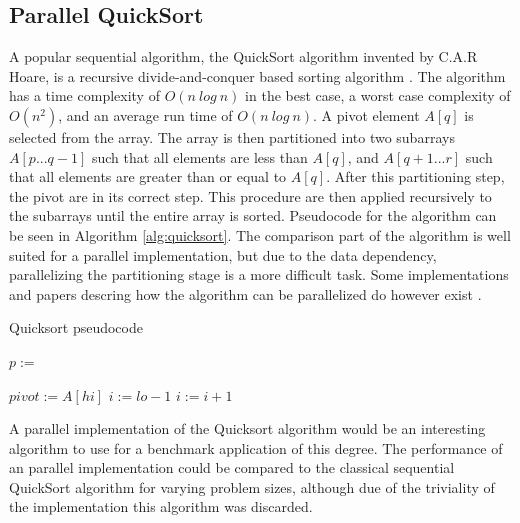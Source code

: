 \subsection{Parallel QuickSort}
A popular sequential algorithm, the QuickSort algorithm invented by C.A.R  Hoare, is a recursive divide-and-conquer based sorting algorithm \cite{hoare1962quicksort}. The algorithm has a time complexity of $O(n \ log \ n)$ in the best case, a worst case complexity of $O(n^2)$, and an average run time of $O(n \ log \ n)$. A pivot element $A[q]$ is selected from the array. The array is then partitioned into two subarrays $A[p...q-1]$ such that all elements are less than $A[q]$, and $A[q+1...r]$ such that all elements are greater than or equal to $A[q]$. After this partitioning step, the pivot are in its correct step. This procedure are then applied recursively to the subarrays until the entire array is sorted. Pseudocode for the algorithm can be seen in Algorithm \ref{alg:quicksort}. The comparison part of the algorithm is well suited for a parallel implementation, but due to the data dependency, parallelizing the partitioning stage is a more difficult task. Some implementations and papers descring how the algorithm can be parallelized do however exist \cite{cederman2009gpu}\cite{sanders1997efficient}\cite{chen2009fast}.

\begin{algorithm}
    \caption{Quicksort pseudocode}
    \label{alg:quicksort}
    \begin{algorithmic}[1]
                \State $p:=$ 
            	\State {}
            	\State {}
            \EndIf
        \EndProcedure
        
            \State $pivot := A[hi]$
            \State $i := lo - 1$
                    \State $i := i + 1$
                    \State {}
                \EndIf
            \EndFor
                \State {}
            \EndIf
        \EndProcedure
    \end{algorithmic}
\end{algorithm}

A parallel implementation of the Quicksort algorithm would be an interesting algorithm to use for a benchmark application of this degree. The performance of an parallel implementation could be compared to the classical sequential QuickSort algorithm for varying problem sizes, although due of the triviality of the implementation this algorithm was discarded.

